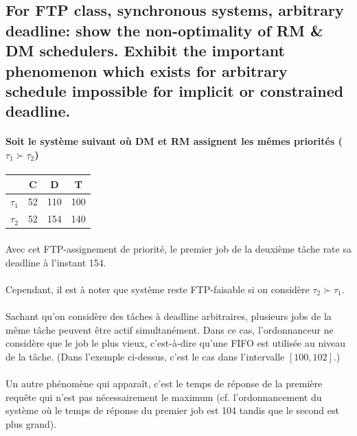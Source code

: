 \subsection{For FTP class, synchronous systems, arbitrary deadline: show the non-optimality of RM \& DM schedulers. Exhibit the important phenomenon which exists for arbitrary schedule impossible for implicit or constrained deadline.}
\paragraph{Soit le système suivant où DM et RM assignent les mêmes priorités ($\tau_{1} \succ \tau_{2}$)}
  \begin{center}
    \begin{tabular}{| l | c | c | c |}
      \hline
                   & C  & D    & T  \\
      \hline
       $\tau_{1}$  & 52 & 110 & 100 \\
      \hline
       $\tau_{2}$  & 52 & 154 & 140 \\
      \hline
  \end{tabular}
  \end{center}
\paragraph{}
Avec cet FTP-assignement de priorité, le premier job de la deuxième tâche rate sa deadline à l'instant 154.
\paragraph{}
Cependant, il est à noter que système reste FTP-faisable si on considère $\tau_{2} \succ \tau_{1}$.

\paragraph{} Sachant qu'on considère des tâches à deadline arbitraires, plusieurs jobs de la même tâche peuvent être actif simultanément. Dans ce cas, l'ordonnanceur ne considère que le job le plus vieux, c'est-à-dire qu'une FIFO est utilisée au niveau de la tâche. (Dans l'exemple ci-dessus, c'est le cas dans l'intervalle $[100, 102]$.)

\paragraph{} Un autre phénomène qui apparaît, c'est le temps de réponse de la première requête qui n'est pas nécessairement le maximum (cf. l'ordonnancement du système où le temps de réponse du premier job est 104 tandis que le second est plus grand).


